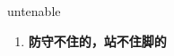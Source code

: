 
\begin{frame}
{\huge untenable}
\begin{center}
\begin{enumerate}\Large
  \item \textbf{防守不住的，站不住脚的}
\end{enumerate}
\end{center}
\end{frame}
